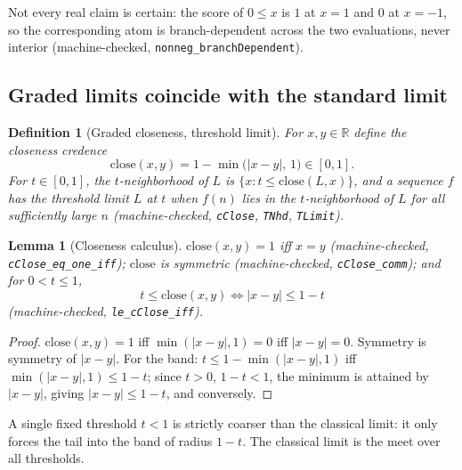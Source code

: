 \documentclass[11pt,a4paper]{article}
\newtheorem{lemma}[theorem]{Lemma}
\newtheorem{definition}[theorem]{Definition}
\newcommand{\Real}{\mathbb{R}}
\begin{document}
Not every real claim is certain: the score of $0 \le x$ is $1$ at
$x = 1$ and $0$ at $x = -1$, so the corresponding atom is
branch-dependent across the two evaluations, never interior
(machine-checked, \texttt{nonneg\_branchDependent}).

\subsection{Graded limits coincide with the standard limit}

\begin{definition}[Graded closeness, threshold limit]
\label{def:tlimit}
For $x, y \in \Real$ define the closeness credence
\[
  \mathrm{close}(x, y) = 1 - \min\bigl(|x - y|,\, 1\bigr) \in [0,1].
\]
For $t \in [0,1]$, the \emph{$t$-neighborhood} of $L$ is
$\{x : t \le \mathrm{close}(L, x)\}$, and a sequence $f$ has the
\emph{threshold limit} $L$ at $t$ when $f(n)$ lies in the
$t$-neighborhood of $L$ for all sufficiently large $n$
(machine-checked, \texttt{cClose}, \texttt{TNhd}, \texttt{TLimit}).
\end{definition}

\begin{lemma}[Closeness calculus]
\label{thm:cclose}
$\mathrm{close}(x,y) = 1$ iff $x = y$
(machine-checked, \texttt{cClose\_eq\_one\_iff});
$\mathrm{close}$ is symmetric
(machine-checked, \texttt{cClose\_comm});
and for $0 < t \le 1$,
\[
  t \le \mathrm{close}(x, y) \iff |x - y| \le 1 - t
\]
(machine-checked, \texttt{le\_cClose\_iff}).
\end{lemma}
\begin{proof}
$\mathrm{close}(x,y) = 1$ iff $\min(|x-y|, 1) = 0$ iff $|x-y| = 0$.
Symmetry is symmetry of $|x - y|$.
For the band: $t \le 1 - \min(|x-y|,1)$ iff
$\min(|x-y|,1) \le 1 - t$; since $t > 0$, $1 - t < 1$, the minimum is
attained by $|x-y|$, giving $|x-y| \le 1 - t$, and conversely.
\end{proof}

A single fixed threshold $t < 1$ is strictly coarser than the
classical limit: it only forces the tail into the band of radius
$1 - t$.
The classical limit is the meet over all thresholds.
\end{document}
